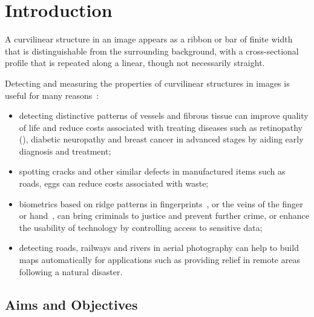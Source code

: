 \section{Introduction}
A curvilinear structure in an image appears as a ribbon or bar of finite width that is distinguishable from the surrounding background, with a cross-sectional profile that is repeated along a linear, though not necessarily straight.


Detecting and measuring the properties of curvilinear structures in images is useful for many reasons~\cite{Ayres_Rangayyan_JEI07}:

\begin{itemize}
\item detecting distinctive patterns of vessels and fibrous tissue can improve quality of life and reduce costs associated with treating diseases such as retinopathy (), diabetic neuropathy and breast cancer in advanced stages by aiding early diagnosis and treatment; %
\item spotting cracks and other similar defects in manufactured items such as roads, eggs can reduce costs associated with waste; %
\item biometrics based on ridge patterns in fingerprints~\cite{missing}, or the veins of the finger~\cite{missing} or hand~\cite{missing}, can bring criminals to justice and prevent further crime, or enhance the usability of technology by controlling access to sensitive data; %
\item detecting roads, railways and rivers in aerial photography can help to build maps automatically for applications such as providing relief in remote areas following a natural disaster.
\end{itemize}


\subsection{Aims and Objectives}

